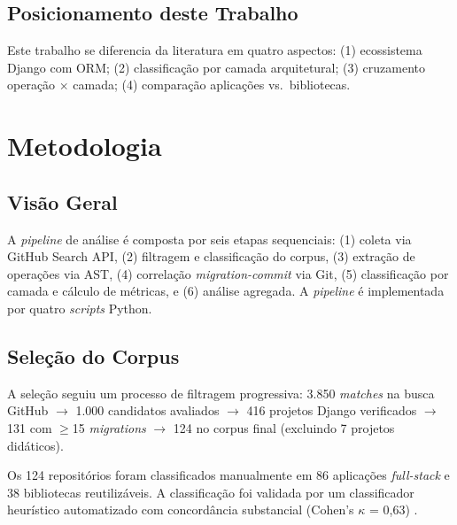 \documentclass[
  12pt,
  openright,
  oneside,
  a4paper,
  brazil
]{abntex2}
\begin{document}
\section{Posicionamento deste Trabalho}

Este trabalho se diferencia da literatura em quatro aspectos: (1) ecossistema Django com ORM; (2) classificação por camada arquitetural; (3) cruzamento operação $\times$ camada; (4) comparação aplicações vs.\ bibliotecas.


\chapter{Metodologia}\label{chap:metodologia}


\section{Visão Geral}

A \textit{pipeline} de análise é composta por seis etapas sequenciais: (1) coleta via GitHub Search API, (2) filtragem e classificação do corpus, (3) extração de operações via AST, (4) correlação \textit{migration-commit} via Git, (5) classificação por camada e cálculo de métricas, e (6) análise agregada. A \textit{pipeline} é implementada por quatro \textit{scripts} Python.


\section{Seleção do Corpus}

A seleção seguiu um processo de filtragem progressiva: 3.850 \textit{matches} na busca GitHub $\rightarrow$ 1.000 candidatos avaliados $\rightarrow$ 416 projetos Django verificados $\rightarrow$ 131 com $\geq$15 \textit{migrations} $\rightarrow$ 124 no corpus final (excluindo 7 projetos didáticos).

Os 124 repositórios foram classificados manualmente em 86 aplicações \textit{full-stack} e 38 bibliotecas reutilizáveis. A classificação foi validada por um classificador heurístico automatizado com concordância substancial (Cohen's $\kappa$ = 0,63) \cite{landis1977}.
\end{document}
